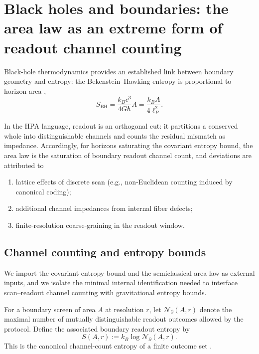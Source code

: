 \section{Black holes and boundaries: the area law as an extreme form of readout channel counting}
\label{sec:black_holes}

Black-hole thermodynamics provides an established link between boundary geometry and entropy: the Bekenstein--Hawking entropy is proportional to horizon area \cite{Bekenstein1973,BardeenCarterHawking1973,Hawking1975,Wald1993Noether},
\begin{equation}
S_{\mathrm{BH}}=\frac{k_B c^3}{4G\hbar}A=\frac{k_B A}{4\ell_P^2}.
\end{equation}

In the HPA language, readout is an orthogonal cut: it partitions a conserved whole into distinguishable channels and counts the residual mismatch as impedance. Accordingly, for horizons saturating the covariant entropy bound, the area law is the saturation of boundary readout channel count, and deviations are attributed to
\begin{enumerate}
    \item lattice effects of discrete scan (e.g., non-Euclidean counting induced by canonical coding);
    \item additional channel impedances from internal fiber defects;
    \item finite-resolution coarse-graining in the readout window.
\end{enumerate}

\subsection{Channel counting and entropy bounds}
We import the covariant entropy bound and the semiclassical area law as external inputs, and we isolate the minimal internal identification needed to interface scan--readout channel counting with gravitational entropy bounds.

\begin{axiom}\label{ax:boundary_channel_entropy}
For a boundary screen of area $A$ at resolution $r$, let $\mathcal{N}_{\partial}(A,r)$ denote the maximal number of mutually distinguishable readout outcomes allowed by the protocol. Define the associated boundary readout entropy by
\begin{equation}
S(A,r):=k_B\log \mathcal{N}_{\partial}(A,r).
\end{equation}
This is the canonical channel-count entropy of a finite outcome set \cite{Shannon1948,CoverThomas2006}.
\end{axiom}

